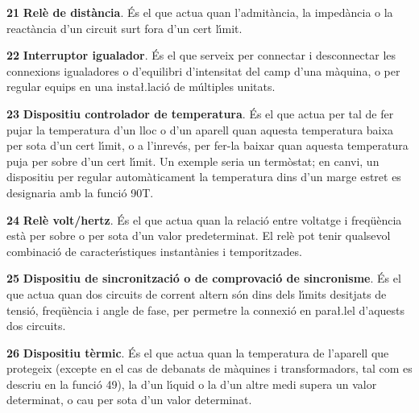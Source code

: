 \begin{multicols}{2}
\begin{list}{}
\item[\textbf{21}]   
\textbf{Rel\`{e} de dist\`{a}ncia}. \'{E}s el que actua
quan l'admit\`{a}ncia, la imped\`{a}ncia o la react\`{a}ncia d'un circuit surt fora d'un cert l\'{\i}mit.

\item[\textbf{22}]   
\textbf{Interruptor igualador}.  \'{E}s el
que serveix per connectar i desconnectar les connexions igualadores
o d'equilibri d'intensitat del camp d'una m\`{a}quina, o per regular
equips en una  insta{\l.l}aci\'{o} de  m\'{u}ltiples unitats.

\item[\textbf{23}]   
\textbf{Dispositiu controlador de temperatura}. \'{E}s el que actua per tal de fer pujar la
temperatura d'un lloc o d'un aparell quan aquesta temperatura baixa
per sota d'un cert l\'{\i}mit, o a l'inrev\'{e}s, per fer-la baixar quan aquesta
temperatura  puja per sobre d'un cert l\'{\i}mit. Un exemple seria un
term\`{o}stat; en canvi, un dispositiu per regular autom\`{a}ticament la temperatura dins
d'un marge estret es designaria amb la funci\'{o} 90T.

\item[\textbf{24}]  
 \textbf{Rel\`{e} volt/hertz}.
\'{E}s el que actua quan la relaci\'{o}  entre voltatge i freq\"{u}\`{e}ncia est\`{a} per sobre o  per sota d'un valor predeterminat. El rel\`{e} pot tenir qualsevol combinaci\'{o} de caracter\'{\i}stiques instant\`{a}nies i temporitzades.

\item[\textbf{25}]   
\textbf{Dispositiu de sincronitzaci\'{o} o de comprovaci\'{o}
de sincronisme}. \'{E}s el que actua quan dos circuits de corrent altern
s\'{o}n dins dels l\'{\i}mits desitjats de tensi\'{o}, freq\"{u}\`{e}ncia i angle de
fase, per permetre la connexi\'{o} en para{\l.l}el d'aquests dos circuits.


\item[\textbf{26}]    
\textbf{Dispositiu t\`{e}rmic}. \'{E}s el que
actua quan la temperatura de l'aparell que protegeix (excepte en el cas de debanats de m\`{a}quines i transformadors, tal com es descriu en la funci\'{o} 49), la d'un l\'{\i}quid o la d'un altre medi  supera un valor
determinat, o cau per sota d'un valor determinat.



\end{list}
\end{multicols}
